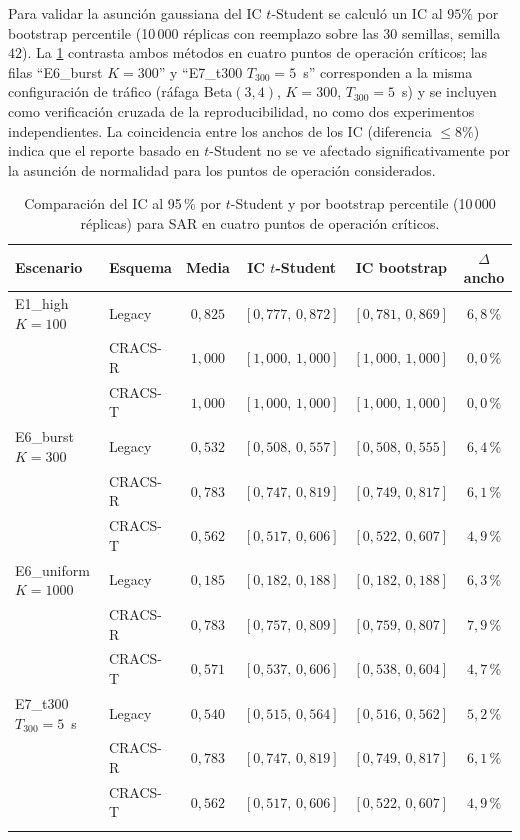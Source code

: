 Para validar la asunción gaussiana del IC $t$-Student se calculó un IC al $95\%$ por bootstrap percentile (10\,000 réplicas con reemplazo sobre las 30 semillas, semilla $42$). La \cref{tab:res_bootstrap} contrasta ambos métodos en cuatro puntos de operación críticos; las filas ``E6\_burst $K{=}300$'' y ``E7\_t300 $T_{300}{=}5$~s'' corresponden a la misma configuración de tráfico (ráfaga Beta$(3,4)$, $K{=}300$, $T_{300}{=}5$~s) y se incluyen como verificación cruzada de la reproducibilidad, no como dos experimentos independientes. La coincidencia entre los anchos de los IC (diferencia $\leq 8\%$) indica que el reporte basado en $t$-Student no se ve afectado significativamente por la asunción de normalidad para los puntos de operación considerados.

\begin{table}[H]
\centering
\caption{Comparación del IC al 95\,\% por $t$-Student y por bootstrap percentile (10\,000 réplicas) para SAR en cuatro puntos de operación críticos.}
\label{tab:res_bootstrap}
\small
\renewcommand{\arraystretch}{1.1}
\begin{tabular}{@{}l l c c c c@{}}
\toprule
\textbf{Escenario} & \textbf{Esquema} & \textbf{Media} & \textbf{IC $t$-Student} & \textbf{IC bootstrap} & \textbf{$\Delta$ ancho} \\
\midrule
E1\_high $K{=}100$ & Legacy & $0{,}825$ & $[0{,}777,\,0{,}872]$ & $[0{,}781,\,0{,}869]$ & $6{,}8$\,\% \\
 & CRACS-R & $1{,}000$ & $[1{,}000,\,1{,}000]$ & $[1{,}000,\,1{,}000]$ & $0{,}0$\,\% \\
 & CRACS-T & $1{,}000$ & $[1{,}000,\,1{,}000]$ & $[1{,}000,\,1{,}000]$ & $0{,}0$\,\% \\
\addlinespace[2pt]
E6\_burst $K{=}300$ & Legacy & $0{,}532$ & $[0{,}508,\,0{,}557]$ & $[0{,}508,\,0{,}555]$ & $6{,}4$\,\% \\
 & CRACS-R & $0{,}783$ & $[0{,}747,\,0{,}819]$ & $[0{,}749,\,0{,}817]$ & $6{,}1$\,\% \\
 & CRACS-T & $0{,}562$ & $[0{,}517,\,0{,}606]$ & $[0{,}522,\,0{,}607]$ & $4{,}9$\,\% \\
\addlinespace[2pt]
E6\_uniform $K{=}1000$ & Legacy & $0{,}185$ & $[0{,}182,\,0{,}188]$ & $[0{,}182,\,0{,}188]$ & $6{,}3$\,\% \\
 & CRACS-R & $0{,}783$ & $[0{,}757,\,0{,}809]$ & $[0{,}759,\,0{,}807]$ & $7{,}9$\,\% \\
 & CRACS-T & $0{,}571$ & $[0{,}537,\,0{,}606]$ & $[0{,}538,\,0{,}604]$ & $4{,}7$\,\% \\
\addlinespace[2pt]
E7\_t300 $T_{300}{=}5$~s & Legacy & $0{,}540$ & $[0{,}515,\,0{,}564]$ & $[0{,}516,\,0{,}562]$ & $5{,}2$\,\% \\
 & CRACS-R & $0{,}783$ & $[0{,}747,\,0{,}819]$ & $[0{,}749,\,0{,}817]$ & $6{,}1$\,\% \\
 & CRACS-T & $0{,}562$ & $[0{,}517,\,0{,}606]$ & $[0{,}522,\,0{,}607]$ & $4{,}9$\,\% \\
\addlinespace[2pt]
\bottomrule
\end{tabular}
\end{table}

